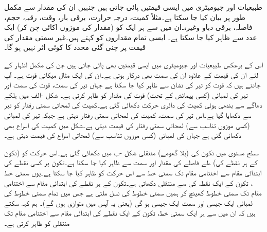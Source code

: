 طبیعیات اور جیومیٹری میں ایسی قیمتیں پائی جاتی ہیں جنہیں ان کی مقدار سے مکمل طور پر بیان کیا جا سکتا ہے۔مثلاً  کمیت، درجہ حرارت، برقی بار، وقت، رقبہ، حجم، فاصلہ، برقی دباو وغیرہ۔ان میں سے ہر ایک کو (مقدار کی موزوں اکائی چن کر) ایک عدد  سے ظاہر کیا جا سکتا ہے۔ ایسی تمام مقداروں کو  کہتے ہیں۔غیر سمتی مقدار کی قیمت پر چنی گئی محدد کا کوئی اثر نہیں ہو گا۔

اس کے برعکس طبیعیات اور جیومیٹری میں ایسی قیمتیں بھی پائی جاتی ہیں جن کی مکمل اظہار کے لئے ان کی قیمت کے علاوہ ان کی سمت بھی درکار ہوتی ہے۔ان کی ایک مثال میکانی  قوت ہے۔ آپ جانتے ہیں کہ قوت کو تیر کی نشان سے ظاہر کیا جا سکتا ہے جہاں تیر کی سمت، قوت کی سمت اور تیر کی لمبائی (کسی پیمائش کے تحت) قوت کی مقدار کو ظاہر کرتی ہے۔ شکل -الف میں ہلکے دھاگے سے بندھی ہوئی کمیت  کی دائری حرکت دکھائی گئی ہے۔کمیت کی لمحاتی سمتی رفتار  کو تیر سے دکھایا گیا ہے۔اس تیر کی سمت، کمیت کی لمحاتی سمتی رفتار دیتی ہے جبکہ تیر کی لمبائی (کسی موزوں تناسب سے) لمحاتی سمتی رفتار کی قیمت دیتی ہے۔شکل میں کمیت کی اسراع  بھی دکھائی گئی ہے جہاں  کی لمبائی (کسی موزوں تناسب سے) لمحاتی اسراع کی قیمت دیتی ہے۔

سطح مستوی میں تکون کی (بلا گھومے) منتقلی شکل -ب میں  دکھائی گئی ہے۔اس حرکت کو (تکون کے ہر نقطے کی) طے فاصلے  کی مقدار اور سمت سے ظاہر کیا جا سکتا ہے۔تکون پر کسی نقطے کی ابتدائی مقام  سے اختتامی مقام  تک سمتی خط سے اس حرکت کو ظاہر کیا جا سکتا ہے۔یوں سمتی خط ، تکون کے ایک نقطہ کی  سے  منتقلی دکھاتی ہے۔تکون کے ہر نقطے کی ابتدائی مقام سے اختتامی مقام تک سمتی خطوط کھینچ کر ہمیں سمتی خطوط کی نسل ملتی ہے جس میں تمام سمتی  خطوط کی لمبائی ایک جیسی  اور  سمت  ایک جیسی ہو گی (یعنی یہ آپس میں متوازی ہوں گے)۔ ہم کہہ سکتے ہیں کہ ان میں سے ہر ایک سمتی خط، تکون کے ایک نقطے کی ابتدائی مقام سے اختتامی مقام تک منتقلی کو ظاہر کرتی ہے۔ 


